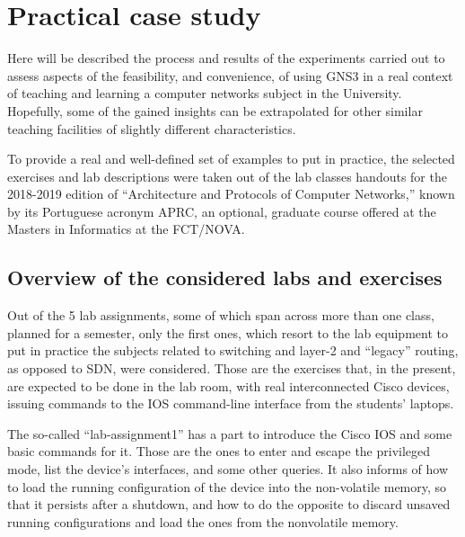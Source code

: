 \section{Practical case study}
\label{sec:gns3practicalcasestudy}

Here will be described the process and results of the experiments carried out to assess aspects of the feasibility, and convenience, of using GNS3 in a real context of teaching and learning a computer networks subject in the University.
Hopefully, some of the gained insights can be extrapolated for other similar teaching facilities of slightly different characteristics.

To provide a real and well-defined set of examples to put in practice, the selected exercises and lab descriptions were taken out of the lab classes handouts for the 2018-2019 edition of ``Architecture and Protocols of Computer Networks,'' known by its Portuguese acronym APRC, an optional, graduate course offered at the Masters in Informatics at the FCT/NOVA.

\subsection{Overview of the considered labs and exercises}
\label{subsec:gns3consideredlabs}

Out of the 5 lab assignments, some of which span across more than one class, planned for a semester, only the first ones, which resort to the lab equipment to put in practice the subjects related to switching and layer-2 and ``legacy'' routing, as opposed to SDN, were considered. %
Those are the exercises that, in the present, are expected to be done in the lab room, with real interconnected Cisco devices, issuing commands to the IOS command-line interface from the students' laptops.

The so-called ``lab-assignment1'' has a part to introduce the Cisco IOS and some basic commands for it.
Those are the ones to enter and escape the privileged mode, list the device's interfaces, and some other queries.
It also informs of how to load the running configuration of the device into the non-volatile memory, so that it persists after a shutdown, and how to do the opposite to discard unsaved running configurations and load the ones from the nonvolatile memory.

